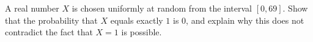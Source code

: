 A real number $X$ is chosen uniformly at random from the interval $[0,69]$. Show that the probability that $X$ equals exactly $1$ is $0$, and explain why this does not contradict the fact that $X=1$ is possible.
